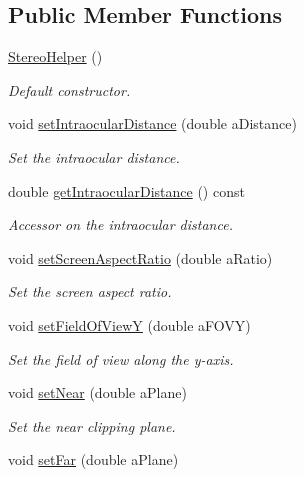 \subsection*{Public Member Functions}
\begin{DoxyCompactItemize}
\item 
\hyperlink{class_graphics_1_1_stereo_helper_a4d75cf7dd224b52ea3b04d9b3f454ea5}{StereoHelper} ()
\begin{DoxyCompactList}\small\item\em Default constructor. \end{DoxyCompactList}\item 
void \hyperlink{class_graphics_1_1_stereo_helper_a618e05eb0080aba955bbbeea19956d32}{setIntraocularDistance} (double aDistance)
\begin{DoxyCompactList}\small\item\em Set the intraocular distance. \end{DoxyCompactList}\item 
double \hyperlink{class_graphics_1_1_stereo_helper_ae5b7d42db1fb2bd3123ded6e7afe1df6}{getIntraocularDistance} () const 
\begin{DoxyCompactList}\small\item\em Accessor on the intraocular distance. \end{DoxyCompactList}\item 
void \hyperlink{class_graphics_1_1_stereo_helper_a0a56378ca52792d45c3e2030fcdff313}{setScreenAspectRatio} (double aRatio)
\begin{DoxyCompactList}\small\item\em Set the screen aspect ratio. \end{DoxyCompactList}\item 
void \hyperlink{class_graphics_1_1_stereo_helper_ac46befc03c787da9275084cf7afed778}{setFieldOfViewY} (double aFOVY)
\begin{DoxyCompactList}\small\item\em Set the field of view along the y-\/axis. \end{DoxyCompactList}\item 
void \hyperlink{class_graphics_1_1_stereo_helper_aa67798ee18abb482b9fdd047e662c1ab}{setNear} (double aPlane)
\begin{DoxyCompactList}\small\item\em Set the near clipping plane. \end{DoxyCompactList}\item 
void \hyperlink{class_graphics_1_1_stereo_helper_a3e495bcd6b6d17d590973a732b9ed761}{setFar} (double aPlane)

\end{DoxyCompactItemize}
